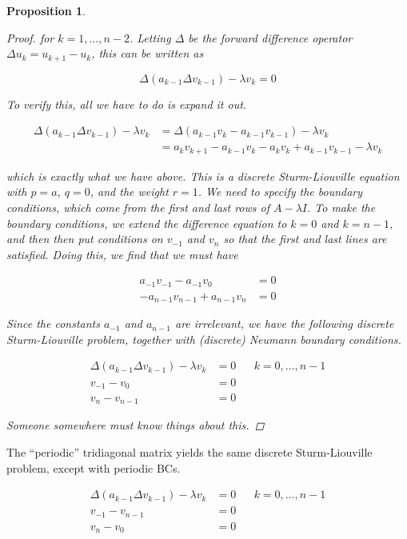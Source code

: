 \documentclass[12pt]{article}
\newtheorem{proposition}{Proposition}
\begin{document}
\begin{proposition}
\begin{proof}
for $k = 1, \dots, n-2$. Letting $\Delta$ be the forward difference operator $\Delta u_k = u_{k+1} - u_k$, this can be written as 

\begin{equation}
\Delta( a_{k-1} \Delta v_{k-1} ) - \lambda v_k = 0
\end{equation}

To verify this, all we have to do is expand it out.

\begin{align*}
\Delta( a_{k-1} \Delta v_{k-1} ) - \lambda v_k 
&= \Delta( a_{k-1} v_k - a_{k-1} v_{k-1}) - \lambda v_k \\
&= a_{k} v_{k+1} - a_{k-1} v_k - a_{k} v_{k} + a_{k-1} v_{k-1} - \lambda v_k
\end{align*}

which is exactly what we have above. This is a discrete Sturm-Liouville equation with $p = a$, $q = 0$, and the weight $r = 1$. We need to specify the boundary conditions, which come from the first and last rows of $A - \lambda I$. To make the boundary conditions, we extend the difference equation to $k = 0$ and $k = n-1$, and then then put conditions on $v_{-1}$ and $v_n$ so that the first and last lines are satisfied. Doing this, we find that we must have

\begin{align*}
a_{-1} v_{-1} - a_{-1} v_0 &= 0 \\
-a_{n-1} v_{n-1} + a_{n-1} v_n &= 0
\end{align*}

Since the constants $a_{-1}$ and $a_{n-1}$ are irrelevant, we have the following discrete Sturm-Liouville problem, together with (discrete) Neumann boundary conditions.

\begin{align}
\Delta( a_{k-1} \Delta v_{k-1} ) - \lambda v_k &= 0 && k = 0, \dots, n-1 \\
v_{-1} - v_0 &= 0 \\
v_{n} - v_{n-1} &= 0
\end{align}

Someone somewhere must know things about this.

\end{proof}
\end{proposition}

The ``periodic'' tridiagonal matrix yields the same discrete Sturm-Liouville problem, except with periodic BCs.

\begin{align}
\Delta( a_{k-1} \Delta v_{k-1} ) - \lambda v_k &= 0 && k = 0, \dots, n-1 \\
v_{-1} - v_{n-1} &= 0 \\
v_{n} - v_0 &= 0
\end{align}
\end{document}

